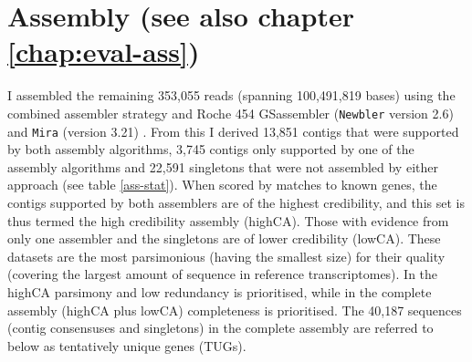 \afterpage{\clearpage}

\section{Assembly (see also chapter \ref{chap:eval-ass})}

I assembled the remaining 353,055 reads (spanning 100,491,819 bases)
using the combined assembler strategy \cite{pmid20950480} and Roche
454 GSassembler (\texttt{Newbler} version 2.6) and \texttt{Mira}
(version 3.21) \cite{miraEST}. From this I derived 13,851 contigs that
were supported by both assembly algorithms, 3,745 contigs only
supported by one of the assembly algorithms and 22,591 singletons that
were not assembled by either approach (see table \ref{ass-stat}). When
scored by matches to known genes, the contigs supported by both
assemblers are of the highest credibility, and this set is thus termed
the high credibility assembly (highCA). Those with evidence from only
one assembler and the singletons are of lower credibility
(lowCA). These datasets are the most parsimonious (having the smallest
size) for their quality (covering the largest amount of sequence in
reference transcriptomes). In the highCA parsimony and low redundancy
is prioritised, while in the complete assembly (highCA plus lowCA)
completeness is prioritised. The 40,187 sequences (contig consensuses
and singletons) in the complete assembly are referred to below as
tentatively unique genes (TUGs).

